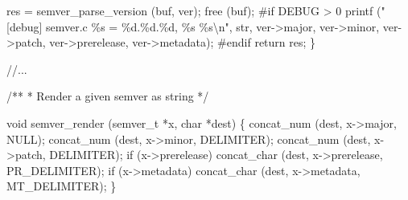 \documentclass[
  a4paper,
]{scrreprt}
\newenvironment{Shaded}{\begin{snugshade}}{\end{snugshade}}
\newcommand{\CommentTok}[1]{\textcolor[rgb]{0.41,0.41,0.41}{#1}}
\newcommand{\ControlFlowTok}[1]{\textcolor[rgb]{0.85,0.12,0.09}{#1}}
\newcommand{\DataTypeTok}[1]{\textcolor[rgb]{0.47,0.16,0.63}{#1}}
\newcommand{\NormalTok}[1]{\textcolor[rgb]{0.33,0.33,0.33}{#1}}
\newcommand{\OperatorTok}[1]{\textcolor[rgb]{0.00,0.46,0.62}{#1}}
\newcommand{\PreprocessorTok}[1]{\textcolor[rgb]{0.47,0.16,0.63}{#1}}
\newcommand{\SpecialCharTok}[1]{\textcolor[rgb]{0.00,0.46,0.62}{#1}}
\newcommand{\StringTok}[1]{\textcolor[rgb]{0.00,0.50,0.00}{#1}}
\theoremstyle{definition}
\theoremstyle{remark}
\begin{document}
\begin{Shaded}
\begin{Highlighting}[numbers=left,,]
\NormalTok{  res }\OperatorTok{=}\NormalTok{ semver\_parse\_version }\OperatorTok{(}\NormalTok{buf}\OperatorTok{,}\NormalTok{ ver}\OperatorTok{);}
\NormalTok{  free }\OperatorTok{(}\NormalTok{buf}\OperatorTok{);}
\PreprocessorTok{\#if DEBUG \textgreater{} 0}
\NormalTok{  printf }\OperatorTok{(}\StringTok{"[debug] semver.c }\SpecialCharTok{\%s}\StringTok{ = }\SpecialCharTok{\%d}\StringTok{.}\SpecialCharTok{\%d}\StringTok{.}\SpecialCharTok{\%d}\StringTok{, }\SpecialCharTok{\%s}\StringTok{ }\SpecialCharTok{\%s\textbackslash{}n}\StringTok{"}\OperatorTok{,}\NormalTok{ str}\OperatorTok{,}\NormalTok{ ver}\OperatorTok{{-}\textgreater{}}\NormalTok{major}\OperatorTok{,}
\NormalTok{          ver}\OperatorTok{{-}\textgreater{}}\NormalTok{minor}\OperatorTok{,}\NormalTok{ ver}\OperatorTok{{-}\textgreater{}}\NormalTok{patch}\OperatorTok{,}\NormalTok{ ver}\OperatorTok{{-}\textgreater{}}\NormalTok{prerelease}\OperatorTok{,}\NormalTok{ ver}\OperatorTok{{-}\textgreater{}}\NormalTok{metadata}\OperatorTok{);}
\PreprocessorTok{\#endif}
  \ControlFlowTok{return}\NormalTok{ res}\OperatorTok{;}
\OperatorTok{\}}

\CommentTok{//...}

\CommentTok{/**}
\CommentTok{ * Render a given semver as string}
\CommentTok{ */}

\DataTypeTok{void}
\NormalTok{semver\_render }\OperatorTok{(}\NormalTok{semver\_t }\OperatorTok{*}\NormalTok{x}\OperatorTok{,} \DataTypeTok{char} \OperatorTok{*}\NormalTok{dest}\OperatorTok{)}
\OperatorTok{\{}
\NormalTok{  concat\_num }\OperatorTok{(}\NormalTok{dest}\OperatorTok{,}\NormalTok{ x}\OperatorTok{{-}\textgreater{}}\NormalTok{major}\OperatorTok{,}\NormalTok{ NULL}\OperatorTok{);}
\NormalTok{  concat\_num }\OperatorTok{(}\NormalTok{dest}\OperatorTok{,}\NormalTok{ x}\OperatorTok{{-}\textgreater{}}\NormalTok{minor}\OperatorTok{,}\NormalTok{ DELIMITER}\OperatorTok{);}
\NormalTok{  concat\_num }\OperatorTok{(}\NormalTok{dest}\OperatorTok{,}\NormalTok{ x}\OperatorTok{{-}\textgreater{}}\NormalTok{patch}\OperatorTok{,}\NormalTok{ DELIMITER}\OperatorTok{);}
  \ControlFlowTok{if} \OperatorTok{(}\NormalTok{x}\OperatorTok{{-}\textgreater{}}\NormalTok{prerelease}\OperatorTok{)}
\NormalTok{    concat\_char }\OperatorTok{(}\NormalTok{dest}\OperatorTok{,}\NormalTok{ x}\OperatorTok{{-}\textgreater{}}\NormalTok{prerelease}\OperatorTok{,}\NormalTok{ PR\_DELIMITER}\OperatorTok{);}
  \ControlFlowTok{if} \OperatorTok{(}\NormalTok{x}\OperatorTok{{-}\textgreater{}}\NormalTok{metadata}\OperatorTok{)}
\NormalTok{    concat\_char }\OperatorTok{(}\NormalTok{dest}\OperatorTok{,}\NormalTok{ x}\OperatorTok{{-}\textgreater{}}\NormalTok{metadata}\OperatorTok{,}\NormalTok{ MT\_DELIMITER}\OperatorTok{);}
\OperatorTok{\}}
\end{Highlighting}
\end{Shaded}
\end{document}

